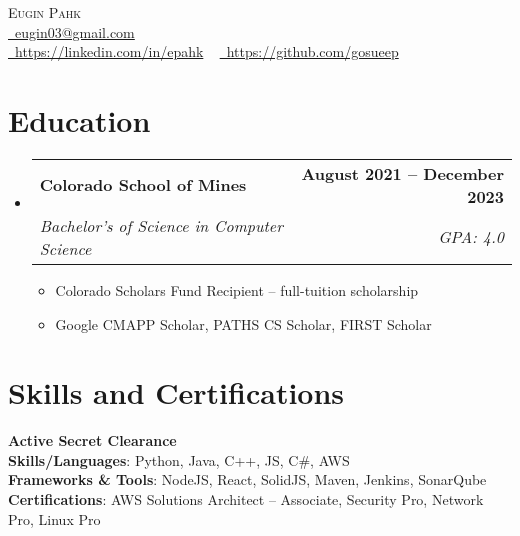 \documentclass[11pt, letterpaper]{article}
\makeatletter
\newcommand{\resumeItem}[1]{
  \item\small{
    {#1 \vspace{-2pt}}
  }
}
\newcommand{\resumeSubheading}[4]{
  \vspace{-2pt}\item
    \begin{tabular*}{1.0\textwidth}[t]{l@{\extracolsep{\fill}}r}
      \textbf{#1} & \textbf{\small #2} \\
      \textit{\small#3} & \textit{\small #4} \\
    \end{tabular*}\vspace{-7pt}
}
\newcommand{\resumeSubHeadingListStart}{\begin{itemize}[leftmargin=0.0in, label={}]}
\newcommand{\resumeSubHeadingListEnd}{\end{itemize}}
\newcommand{\resumeItemListStart}{\begin{itemize}}
\newcommand{\resumeItemListEnd}{\end{itemize}\vspace{-5pt}}
\makeatother
\begin{document}
\begin{center}
    {
    \huge \scshape Eugin Pahk} \\ \vspace{4pt}
    \small
    \href{mailto:eugin03@gmail.com}{\faEnvelope\ eugin03@gmail.com} ~ \\
    \vspace{2pt}
    \href{https://linkedin.com/in/epahk}{\faLinkedin\ https://linkedin.com/in/epahk}  ~
    \href{https://github.com/gosueep}{\faGithub\ https://github.com/gosueep}
    \vspace{-5pt}
\end{center}




\section{Education}   %
  \resumeSubHeadingListStart
    \resumeSubheading
      {Colorado School of Mines}{August 2021 -- December 2023}
      {Bachelor's of Science in Computer Science }{GPA: 4.0}
      \resumeItemListStart
        \resumeItem{Colorado Scholars Fund Recipient -- full-tuition scholarship}
        \resumeItem{Google CMAPP Scholar, PATHS CS Scholar, FIRST Scholar}
      \resumeItemListEnd
    \resumeSubHeadingListEnd

\section{Skills and Certifications}   %
 \begin{itemize}[leftmargin=0.1in, label={}]
    \small{\item{
      \textbf{Active Secret Clearance}\\
      \textbf{Skills/Languages}{: Python, Java, C++, JS, C\#, AWS} \\
      \textbf{Frameworks \& Tools}{: NodeJS, React, SolidJS, Maven, Jenkins, SonarQube} \\
      \textbf{Certifications}{: AWS Solutions Architect -- Associate, Security Pro, Network Pro, Linux Pro}\\
    }}
 \end{itemize}
\end{document}
